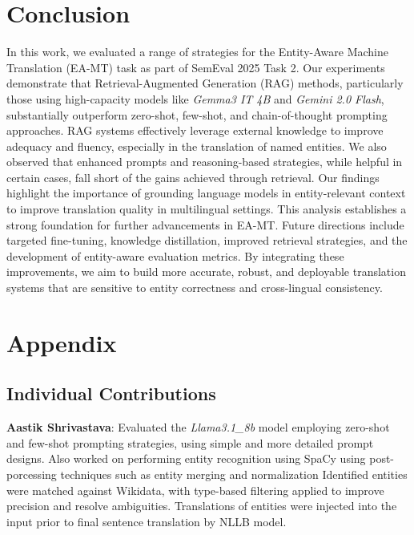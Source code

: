 \documentclass[final]{ecai}
\begin{document}
\section{Conclusion}
\label{sec:conclusion}
In this work, we evaluated a range of strategies for the Entity-Aware Machine Translation (EA-MT) 
task as part of SemEval 2025 Task 2. Our experiments demonstrate that Retrieval-Augmented 
Generation (RAG) methods, particularly those using high-capacity models like \textit{Gemma3 IT 4B} 
and \textit{Gemini 2.0 Flash}, substantially outperform zero-shot, few-shot, and chain-of-thought 
prompting approaches. RAG systems effectively leverage external knowledge to improve adequacy and 
fluency, especially in the translation of named entities.
We also observed that enhanced prompts and reasoning-based strategies, while helpful in certain 
cases, fall short of the gains achieved through retrieval. Our findings highlight the importance
of grounding language models in entity-relevant context to improve translation quality in 
multilingual settings.
This analysis establishes a strong foundation for further advancements in EA-MT. 
Future directions include targeted fine-tuning, knowledge distillation, improved retrieval 
strategies, and the development of entity-aware evaluation metrics. By integrating these 
improvements, we aim to build more accurate, robust, and deployable translation systems that 
are sensitive to entity correctness and cross-lingual consistency.




\clearpage
\renewcommand{\thesection}{A}
\renewcommand{\thesubsection}{A.\arabic{subsection}}

\section{Appendix}

\subsection{Individual Contributions}

\textbf{Aastik Shrivastava}: Evaluated the \textit{Llama3.1\_8b} model employing zero-shot and few-shot prompting strategies, using simple 
and more detailed prompt designs. Also worked on performing entity recognition using SpaCy using post-porcessing techniques such as 
entity merging and normalization Identified entities were matched against Wikidata, with type-based filtering applied to improve precision and resolve ambiguities. 
Translations of entities were injected into the input prior to final sentence translation by NLLB model.
\end{document}
